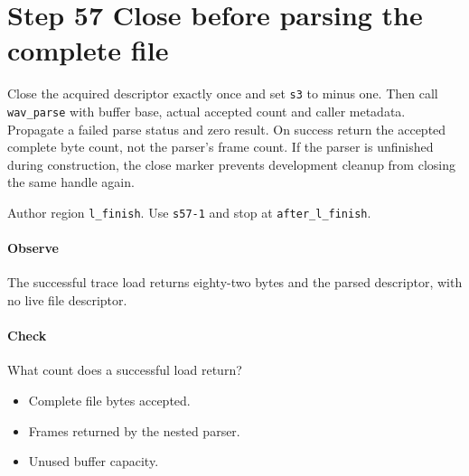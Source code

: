 \section{Step 57 Close before parsing the complete file}\label{pcm-wav-s57}
Close the acquired descriptor exactly once and set \texttt{s3} to minus one. Then call \texttt{wav\_parse} with buffer base, actual accepted count and caller metadata. Propagate a failed parse status and zero result. On success return the accepted complete byte count, not the parser's frame count. If the parser is unfinished during construction, the close marker prevents development cleanup from closing the same handle again.

Author region \texttt{l\_finish}. Use \texttt{s57-1} and stop at \texttt{after\_l\_finish}.

\paragraph{Observe} The successful trace load returns eighty-two bytes and the parsed descriptor, with no live file descriptor.

\paragraph{Check} What count does a successful load return?
\begin{itemize}
  \item[A.] Complete file bytes accepted.
  \item[B.] Frames returned by the nested parser.
  \item[C.] Unused buffer capacity.
\end{itemize}

